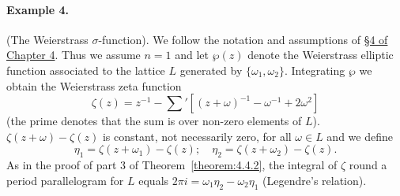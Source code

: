 \paragraph{Example 4.} (The Weierstrass $\sigma$-function). We follow the notation and assumptions of \hyperref[sec:4:4]{\S4 of Chapter 4}. Thus we assume $n=1$ and let $\wp(z)$ denote the Weierstrass elliptic function associated to the lattice $L$ generated by $\{\omega_1,\omega_2\}$. Integrating $\wp$ we obtain the Weierstrass zeta function
\[\zeta(z)=z^{-1}-\sum{}'[(z+\omega)^{-1}-\omega^{-1}+2\omega^2]\]
(the prime denotes that the sum is over non-zero elements of $L$). $\zeta(z+\omega)-\zeta(z)$ is constant, not necessarily zero, for all $\omega\in L$ and we define
\[\eta_1=\zeta(z+\omega_1)-\zeta(z);\quad\eta_2=\zeta(z+\omega_2)-\zeta(z).\tag{B}\label{eq:5:b:1}\]
As in the proof of part 3 of Theorem~\ref{theorem:4.4.2}, the integral of $\zeta$ round a period parallelogram for $L$ equals $2\pi i=\omega_1\eta_2-\omega_2\eta_1$ (Legendre's relation).

